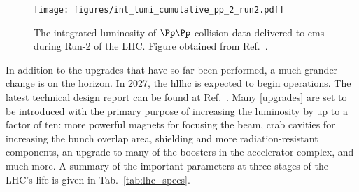 \begin{figure}[htbp]
    \centering
    \texttt{[image: figures/int\_lumi\_cumulative\_pp\_2\_run2.pdf]}
    \caption[The integrated luminosity of $\Pp\Pp$ collision data delivered to CMS during Run-2 of the LHC]{The integrated luminosity of $\Pp\Pp$ collision data delivered to \acrshort{cms} during Run-2 of the LHC. Figure obtained from Ref.~.}
    \label{fig:detector_cms_lumi}
\end{figure}

In addition to the upgrades that have so far been performed, a much grander change is on the horizon. In 2027, the \acrfull{hllhc} is expected to begin operations. The latest technical design report can be found at Ref.~. Many [upgrades] are set to be introduced with the primary purpose of increasing the luminosity by up to a factor of ten: more powerful magnets for focusing the beam, crab cavities for increasing the bunch overlap area, shielding and more radiation-resistant components, an upgrade to many of the boosters in the accelerator complex, and much more. A summary of the important parameters at three stages of the LHC's life is given in Tab.~\ref{tab:lhc_specs}.

